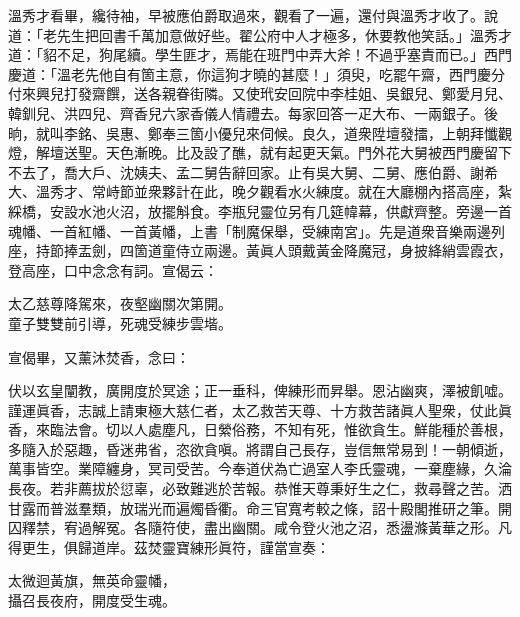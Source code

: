 溫秀才看畢，纔待袖，早被應伯爵取過來，觀看了一遍，還付與溫秀才收了。說道：「老先生把回書千萬加意做好些。翟公府中人才極多，休要教他笑話。」溫秀才道：「貂不足，狗尾續。學生匪才，焉能在班門中弄大斧！不過乎塞責而已。」西門慶道：「溫老先他自有箇主意，你這狗才曉的甚麼！」須臾，吃罷午齋，西門慶分付來興兒打發齋饌，送各親眷街隣。又使玳安回院中李桂姐、吳銀兒、鄭愛月兒、韓釧兒、洪四兒、齊香兒六家香儀人情禮去。每家回答一疋大布、一兩銀子。後晌，就叫李銘、吳惠、鄭奉三箇小優兒來伺候。良久，道衆陞壇發擂，上朝拜懺觀燈，解壇送聖。天色漸晚。比及設了醮，就有起更天氣。門外花大舅被西門慶留下不去了，喬大戶、沈姨夫、孟二舅告辭回家。止有吳大舅、二舅、應伯爵、謝希大、溫秀才、常峙節並衆夥計在此，晚夕觀看水火練度。就在大廳棚內搭高座，紮綵橋，安設水池火沼，放擺斛食。李瓶兒靈位另有几筵幃幕，供獻齊整。旁邊一首魂幡、一首紅幡、一首黃幡，上書「制魔保舉，受練南宮」。先是道衆音樂兩邊列座，持節捧盂劍，四箇道童侍立兩邊。黃眞人頭戴黃金降魔冠，身披絳綃雲霞衣，登高座，口中念念有詞。宣偈云：

\begin{myquote} 
太乙慈尊降駕來，夜壑幽關次第開。\\童子雙雙前引導，死魂受練步雲堦。
\end{myquote} 

宣偈畢，又薰沐焚香，念曰：

\begin{myquote}[\markfont]
伏以玄皇闡教，廣開度於冥途；正一垂科，俾練形而昇舉。恩沾幽爽，澤被飢嘘。謹運眞香，志誠上請東極大慈仁者，太乙救苦天尊、十方救苦諸眞人聖衆，仗此眞香，來臨法會。切以人處塵凡，日縈俗務，不知有死，惟欲貪生。鮮能種於善根，多隨入於惡趣，昏迷弗省，恣欲貪嗔。將謂自己長存，豈信無常易到！一朝傾逝，萬事皆空。業障纏身，冥司受苦。今奉道伏為亡過室人李氏靈魂，一棄塵緣，久淪長夜。若非薦拔於愆辜，必致難逃於苦報。恭惟天尊秉好生之仁，救尋聲之苦。洒甘露而普滋羣類，放瑞光而遍燭昏衢。命三官寬考較之條，詔十殿閣推研之筆。開囚釋禁，宥過解冤。各隨符使，盡出幽關。咸令登火池之沼，悉盪滌黃華之形。凡得更生，俱歸道岸。茲焚靈寶練形眞符，謹當宣奏：

太微迴黃旗，無英命靈幡，\\攝召長夜府，開度受生魂。

\end{myquote} 

